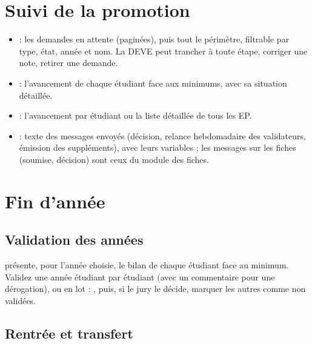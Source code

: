\documentclass[11pt,a4paper]{article}
\begin{document}
\section{Suivi de la promotion}

\begin{itemize}
  \item {} : les demandes en attente (paginées), puis tout le périmètre,
    filtrable par type, état, année et nom. La DEVE peut trancher à toute étape, corriger une
    note, retirer une demande.
  \item {} : l'avancement de chaque étudiant face aux minimums, avec sa
    situation détaillée.
  \item {} : l'avancement par étudiant ou la liste détaillée de tous les EP.
  \item {} : texte des messages envoyés (décision, relance hebdomadaire des
    validateurs, émission des suppléments), avec leurs variables ; les messages sur les fiches
    (soumise, décision) sont ceux du module des fiches.
\end{itemize}


\section{Fin d'année}

\subsection{Validation des années}

 présente, pour l'année choisie, le bilan de
chaque étudiant face au minimum. Validez une année étudiant par étudiant (avec un commentaire
pour une dérogation), ou en lot : , puis, si le jury le
décide, marquer les autres comme non validées.


\subsection{Rentrée et transfert}
\end{document}
